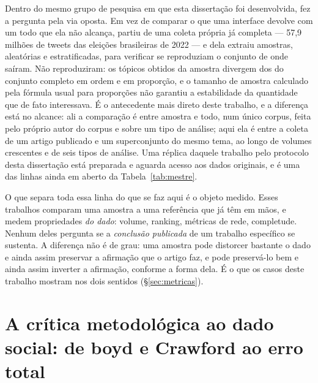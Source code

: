 Dentro do mesmo grupo de pesquisa em que esta dissertação foi desenvolvida,
 fez a pergunta pela via oposta. Em vez de comparar o
que uma interface devolve com um todo que ela não alcança, partiu de uma coleta própria
já completa --- 57,9 milhões de tweets das eleições brasileiras de 2022 --- e dela
extraiu amostras, aleatórias e estratificadas, para verificar se reproduziam o conjunto
de onde saíram. Não reproduziram: os tópicos obtidos da amostra divergem dos do
conjunto completo em ordem e em proporção, e o tamanho de amostra calculado pela
fórmula usual para proporções não garantiu a estabilidade da quantidade que de fato
interessava. É o antecedente mais direto deste trabalho, e a diferença está no alcance:
ali a comparação é entre amostra e todo, num único corpus, feita pelo próprio autor do
corpus e sobre um tipo de análise; aqui ela é entre a coleta de um artigo publicado e
um superconjunto do mesmo tema, ao longo de volumes crescentes e de seis tipos de
análise. Uma réplica daquele trabalho pelo protocolo desta dissertação está preparada
e aguarda acesso aos dados originais, e é uma das linhas ainda em aberto da
Tabela~\ref{tab:mestre}.

O que separa toda essa linha do que se faz aqui é o objeto medido. Esses trabalhos
comparam uma amostra a uma referência que já têm em mãos, e medem propriedades
\emph{do dado}: volume, ranking, métricas de rede, completude. Nenhum deles pergunta se
a \emph{conclusão publicada} de um trabalho específico se sustenta. A diferença não é
de grau: uma amostra pode distorcer bastante o dado e ainda assim preservar a
afirmação que o artigo faz, e pode preservá-lo bem e ainda assim inverter a afirmação,
conforme a forma dela. É o que os casos deste trabalho mostram nos dois sentidos
(\S\ref{sec:metricas}).

\section[A crítica ao dado social: boyd e Crawford]{A crítica metodológica ao dado social: de boyd e Crawford ao erro total}
\label{sec:rel-critica}

